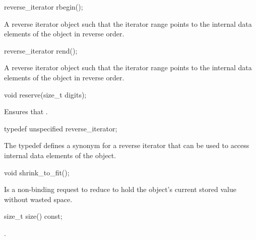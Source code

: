 \begin{addedblock}
\begin{itemdecl}
reverse_iterator rbegin();
\end{itemdecl}

\begin{itemdescr}
\returns A reverse iterator object such that the iterator range \tcode{[crbegin(), crend())} points to the internal data elements of the  object in reverse order.
\end{itemdescr}

\begin{itemdecl}
reverse_iterator rend();
\end{itemdecl}

\begin{itemdescr}
\returns A reverse iterator object such that the iterator range \tcode{[crbegin(), crend())} points to the internal data elements of the  object in reverse order.
\end{itemdescr}

\begin{itemdecl}
void reserve(size_t digits);
\end{itemdecl}

\begin{itemdescr}
\effects Ensures that .
\end{itemdescr}

\begin{itemdecl}
typedef unspecified reverse_iterator;
\end{itemdecl}

\begin{itemdescr}
The typedef defines a synonym for a reverse iterator that can be used to access internal data elements of the  object.
\end{itemdescr}

\begin{itemdecl}
void shrink_to_fit();
\end{itemdecl}

\begin{itemdescr}
\effect Is a non-binding request to reduce  to hold the  object's current stored value without wasted space.
\end{itemdescr}

\begin{itemdecl}
size_t size() const;
\end{itemdecl}

\begin{itemdescr}
\returns {}.
\end{itemdescr}


\end{addedblock}
